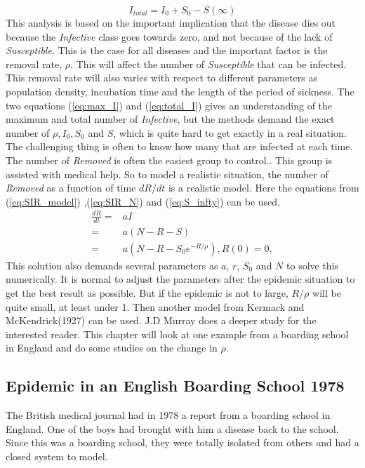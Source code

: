 \documentclass[%
twoside,                 %
final,                   %
10pt]{article}
\begin{document}
\begin{equation} \label{eq:total_I}
I_{total} = I_0 + S_0 -S(\infty)
\end{equation}
This analysis is based on the important implication that the disease dies out because the \emph{Infective} class goes towards zero, and not because of the lack of \emph{Susceptible}. This is the case for all diseases and the important factor is the removal rate, $\rho$. This will affect the number of \emph{Susceptible} that can be infected. This removal rate will also varies with respect to different parameters as population density, incubation time and the length of the period of sickness. The two equations (\ref{eq:max_I}) and (\ref{eq:total_I}) gives an understanding of the maximum and total number of \emph{Infective}, but the methods demand the exact number of $\rho,I_0,S_0$ and $S$, which is quite hard to get exactly in a real situation. The challenging thing is often to know how many that are infected at each time. The number of \emph{Removed} is often the easiest group to control.. This group is assisted with medical help. So to model a realistic situation, the number of \emph{Removed} as a function of time $dR/dt$ is a realistic model. Here the equations from (\ref{eq:SIR_model}) ,(\ref{eq:SIR_N}) and (\ref{eq:S_infty}) can be used.
\begin{equation} \label{eq:dR_normal}
	\begin{aligned} 
	\frac{dR}{dt} =& aI\\
	=& a(N-R-S)\\
	=& a(N-R-S_0e^{-R/\rho}), R(0)=0,
	\end{aligned}
\end{equation}
This solution also demands several parameters as $a$, $r$, $S_0$ and $N$ to solve this numerically. It is normal to adjust the parameters after the epidemic situation to get the best result as possible. But if the epidemic is not to large, $R/\rho$ will be quite small, at least under 1. Then another model from Kermack and McKendrick(1927) can be used. J.D Murray does a deeper study \cite{murray2002mathematical} for the interested reader. This chapter will look at one example from a boarding school in England and do some studies on the change in $\rho$.  

\subsection{Epidemic in an English Boarding School 1978}
The British medical journal had in 1978 a report from a boarding school in England. One of the boys had brought with him a disease back to the school. Since this was a boarding school, they were totally isolated from others and had a closed system to model. 
\end{document}
